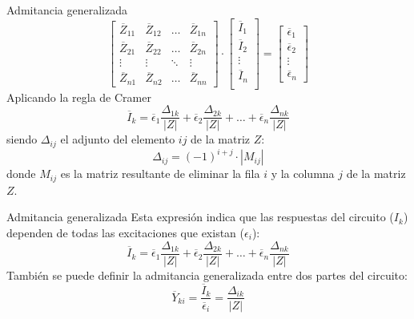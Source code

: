 \documentclass[aspectratio=169, usenames,svgnames,dvipsnames]{beamer}
\begin{document}
\begin{frame}[label={sec:orgf43e236}]{Admitancia generalizada}
\begin{equation*}
  \begin{bmatrix}
    \overline{Z}_{11} & \overline{Z}_{12} & \dots & \overline{Z}_{1n} \\
    \overline{Z}_{21} & \overline{Z}_{22} & \dots & \overline{Z}_{2n} \\
    \vdots & \vdots & \ddots & \vdots \\
    \overline{Z}_{n1} & \overline{Z}_{n2} &  \dots & \overline{Z}_{nn}
  \end{bmatrix} \cdot %
  \begin{bmatrix}
    \overline{I}_1\\
    \overline{I}_2\\
    \vdots \\
    \overline{I}_n\\
  \end{bmatrix} = %
  \begin{bmatrix}
    \overline{\epsilon}_1\\
    \overline{\epsilon}_2\\
    \vdots \\
    \overline{\epsilon}_n
  \end{bmatrix}
\end{equation*}
Aplicando la regla de Cramer
\[
  \overline{I}_k = \overline{\epsilon}_1 \frac{\Delta_{1k}}{|Z|} + \overline{\epsilon}_2 \frac{\Delta_{2k}}{|Z|} + \dots + \overline{\epsilon}_n \frac{\Delta_{nk}}{|Z|}
\]
siendo \(\Delta_{ij}\) el adjunto del elemento \(ij\) de la matriz \(Z\):
\[
  \Delta_{ij} = (-1)^{i+j} \cdot |M_{ij}|
\]
donde \(M_{ij}\) es la matriz resultante de eliminar la fila \(i\) y la columna \(j\) de la matriz \(Z\).
\end{frame}

\begin{frame}[label={sec:org9550a2e}]{Admitancia generalizada}
Esta expresión indica que las respuestas del circuito (\(I_k\)) dependen de todas las excitaciones que existan (\(\epsilon_i\)):
\[
  \overline{I}_k = \overline{\epsilon}_1 \frac{\Delta_{1k}}{|Z|} + \overline{\epsilon}_2 \frac{\Delta_{2k}}{|Z|} + \dots + \overline{\epsilon}_n \frac{\Delta_{nk}}{|Z|}
\]
También se puede definir la admitancia generalizada entre dos partes del circuito:
\[
  \overline{Y}_{ki} = \frac{\overline{I}_k}{\overline{\epsilon}_i} = \frac{\Delta_{ik}}{|Z|}
\]
\end{frame}
\end{document}
